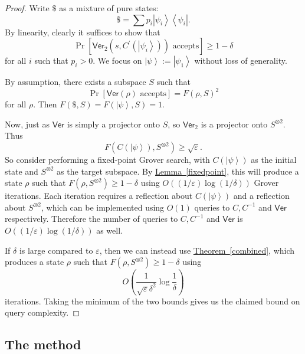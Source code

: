 \documentclass[10pt]{article}
\theoremstyle{definition}
\numberwithin{equation}{section}
\newcommand{\expref}[2]{\texorpdfstring{\hyperref[#2]{#1~\ref{#2}}}{#1~\ref{#2}}}
\begin{document}
\begin{proof}
Write $\$$ as a mixture of pure states:%
\[
\$=\sum p_{i}\left\vert \psi_{i}\right\rangle \left\langle \psi_{i}\right\vert
.
\]
By linearity, clearly it suffices to show that%
\[
\Pr\left[  \mathsf{Ver}_{2}\left(  s,C^{\prime}\left(  \left\vert \psi
_{i}\right\rangle \right)  \right)  \text{ accepts}\right]  \geq1-\delta
\]
for all $i$ such that $p_{i}>0$. We focus on $\left\vert \psi\right\rangle
:=\left\vert \psi_{1}\right\rangle $ without loss of generality.

By assumption, there exists a subspace $S$ such that%
\[
\Pr\left[  \mathsf{Ver}\left(  \rho\right)  \text{ accepts}\right]  =F\left(
\rho,S\right)  ^{2}%
\]
for all $\rho$. Then $F\left(  \$,S\right)  =F\left(  \left\vert
\psi\right\rangle ,S\right)  =1$.

Now, just as $\mathsf{Ver}$ is simply a projector onto $S$, so $\mathsf{Ver}%
_{2}$ is a projector onto $S^{\otimes2}$. Thus%
\[
F\left(  C\left(  \left\vert \psi\right\rangle \right)  ,S^{\otimes2}\right)
\geq\sqrt{\varepsilon}.
\]
So consider performing a fixed-point Grover search, with $C\left(  \left\vert
\psi\right\rangle \right)  $ as the initial state and $S^{\otimes2}$ as the
target subspace. By \expref{Lemma}{fixedpoint}, this will produce a state $\rho
$ such that $F\left(  \rho,S^{\otimes2}\right)  \geq1-\delta$ using
$O\left(({1}/{\varepsilon}) \log ({1}/{\delta})\right)  $ Grover
iterations. Each iteration requires a reflection about $C\left(  \left\vert
\psi\right\rangle \right)  $ and a reflection about $S^{\otimes2}$, which can
be implemented using $O\left(  1\right)  $ queries to $C,C^{-1}$ and
$\mathsf{Ver}$ respectively. Therefore the number of queries to $C,C^{-1}$
and $\mathsf{Ver}$ is $O\left(({1}/{\varepsilon}) \log ({1}/{\delta
})\right)$ as well.

If $\delta$ is large compared to $\varepsilon$, then we can instead use
\expref{Theorem}{combined}, which produces a state $\rho$ such that $F\left(
\rho,S^{\otimes2}\right)  \geq1-\delta$ using 
\[
O\left(  \frac{1}
{\sqrt{\varepsilon}\delta^{2}}\log\frac{1}{\delta}\right)
\]
iterations.
Taking the minimum of the two bounds gives us the claimed bound on query complexity.
\end{proof}
\setcounter{section}{4}\setcounter{subsection}{1}\setcounter{theorem}{0}
\subsection{The method\label{THEMETHOD}}
\end{document}
